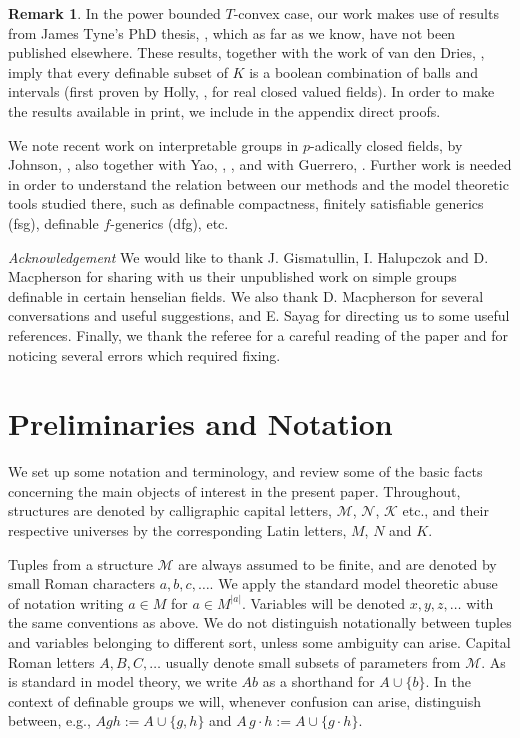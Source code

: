 \documentclass[11pt]{amsart}
\theoremstyle{definition}
\newtheorem{remark}[theorem]{Remark}
\newcommand{\CK}{{\mathcal K}}
\newcommand{\CN}{{\mathcal N}}
\newcommand{\CM}{{\mathcal M}}
\newcommand{\0}{\emptyset}
\begin{document}
\begin{remark}
    In the power bounded $T$-convex  case, our work makes use of results from James Tyne's PhD thesis, \cite{tynephd}, which as far as we know, have not been published elsewhere. These results, together with the work of van den Dries, \cite{vdDries-Tconvex}, imply that every definable subset of $K$ is a boolean combination of balls and intervals (first proven by Holly, \cite{holly}, for real closed valued fields). In order to make the results available in print, we include in the appendix direct proofs.
\end{remark}


\vspace{.2cm}

We note recent work on interpretable groups in $p$-adically closed fields, by Johnson, \cite{JohnTopQp}, also together with  Yao,  \cite{JohnYao}, \cite{JohnYaoAbelian},  and with Guerrero, \cite{JohnGue}.  Further work is needed in order to understand the relation between our methods and the model theoretic tools studied there,  such as definable compactness, finitely satisfiable generics (fsg), definable $f$-generics (dfg), etc.

\vspace{.2cm}

\noindent\emph{Acknowledgement} We would like to thank J. Gismatullin, I. Halupczok and D. Macpherson  for sharing with us their unpublished work on simple groups definable in certain henselian fields. We also thank D. Macpherson for several conversations and useful suggestions, and E. Sayag for directing us to some useful references.  Finally, we thank the referee for a careful reading of the paper and for noticing several errors which required fixing.




\section{Preliminaries and Notation}
We set up some notation and terminology, and review some of the basic facts concerning the main objects of interest in the present paper.  Throughout, structures are denoted by  calligraphic capital letters, $\CM$, $\CN$, $\CK$ etc., and their respective universes by the corresponding Latin letters, $M$, $N$ and $K$. 

Tuples from a structure $\CM$ are always assumed to be finite, and are denoted by small Roman characters $a,b,c,\dots$. We apply the standard model theoretic abuse of notation writing $a\in M$ for $a\in M^{|a|}$. Variables will be denoted $x,y,z,\dots$ with the same conventions as above. We do not distinguish notationally between tuples and variables belonging to different sort, unless some ambiguity can arise. Capital Roman letters $A,B,C,\ldots$ usually denote small subsets of parameters from $\CM$. As is standard in model theory, we write $Ab$ as a shorthand for $A\cup \{b\}$. In the context of definable groups we will, whenever confusion can arise, distinguish between, e.g., $Agh:=A\cup\{g,h\}$ and $A\,g\!\cdot \! h:=A\cup \{g\!\cdot\! h\}$. 
\end{document}
